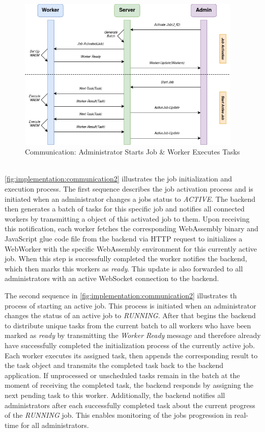 \begin{figure}[htbp]
    \centering
    \includegraphics[width=0.95\textwidth]{gfx/figures/communication-jobexecution-label.png}
    \caption{Communication: Administrator Starts Job \& Worker Executes Tasks}
    \label{fig:implementation:communication2}
\end{figure}
~\\
\autoref{fig:implementation:communication2} illustrates the job initialization and execution process. The first sequence describes the job activation process and is initiated when an administrator changes a jobs status to \emph{ACTIVE}. The backend then generates a batch of tasks for this specific job and notifies all connected workers by transmitting a object of this activated job to them. Upon receiving this notification, each worker fetches the corresponding WebAssembly binary and JavaScript glue code file from the backend via \acs{HTTP} request to initializes a WebWorker with the specific WebAssembly environment for this currently active job. When this step is successfully completed the worker notifies the backend, which then marks this workers as \emph{ready}. This update is also forwarded to all administrators with an active WebSocket connection to the backend.

The second sequence in \autoref{fig:implementation:communication2} illustrates th process of starting an active job. This process is initiated when an administrator changes the status of an active job to \emph{RUNNING}. After that begins the backend to distribute unique tasks from the current batch to all workers who have been marked as \emph{ready} by transmitting the \emph{Worker Ready} message and therefore already have successfully completed the initialization process of the currently active job. Each worker executes its assigned task, then appends the corresponding result to the task object and transmits the completed task back to the backend application. If unprocessed or unscheduled tasks remain in the batch at the moment of receiving the completed task, the backend responds by assigning the next pending task to this worker. Additionally, the backend notifies all administrators after each successfully completed task about the current progress of the \emph{RUNNING} job. This enables monitoring of the jobs progression in real-time for all administrators.

